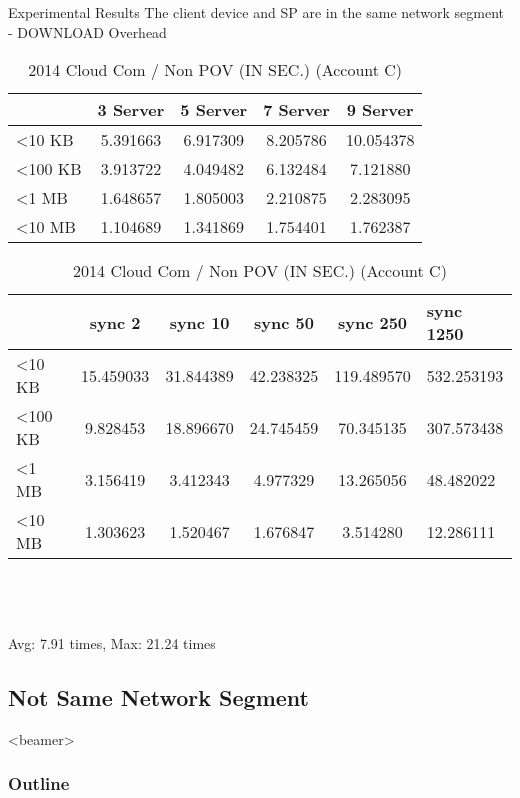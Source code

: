 \begin{frame}{Experimental Results}
{The client device and SP are in the same network segment - DOWNLOAD Overhead}
	\scriptsize
    \begin{table}[]
    \centering
    \caption{My Method / Non POV (IN SEC.) (Account C)}
    \begin{tabular}{lcccc}
                         & 3 Server & 5 Server & 7 Server & 9 Server  \\ \hline
        \textless 10 KB  & 5.391663 & 6.917309 & 8.205786 & 10.054378 \\ \hline
        \textless 100 KB & 3.913722 & 4.049482 & 6.132484 & 7.121880  \\ \hline
        \textless 1 MB   & 1.648657 & 1.805003 & 2.210875 & 2.283095  \\ \hline
        \textless 10 MB  & 1.104689 & 1.341869 & 1.754401 & 1.762387  \\ \hline
    \end{tabular}
    \caption{2014 Cloud Com / Non POV (IN SEC.) (Account C)}
    \begin{tabular}{lccccl}
                         & sync 2    & sync 10   & sync 50   & sync 250   & sync 1250  \\ \hline
        \textless 10 KB  & 15.459033 & 31.844389 & 42.238325 & 119.489570 & 532.253193 \\ \hline
        \textless 100 KB & 9.828453  & 18.896670 & 24.745459 & 70.345135  & 307.573438 \\ \hline
        \textless 1 MB   & 3.156419  & 3.412343  & 4.977329  & 13.265056  & 48.482022  \\ \hline
        \textless 10 MB  & 1.303623  & 1.520467  & 1.676847  & 3.514280   & 12.286111  \\ \hline
    \end{tabular}
    ~\\
    ~\\
    ~\\
    \alert{Avg: 7.91 times, Max: 21.24 times}
    \end{table}
\end{frame}

\subsection{Not Same Network Segment}
\begin{frame}<beamer>
    \frametitle{Outline}
    \tableofcontents[currentsubsection]
\end{frame}

